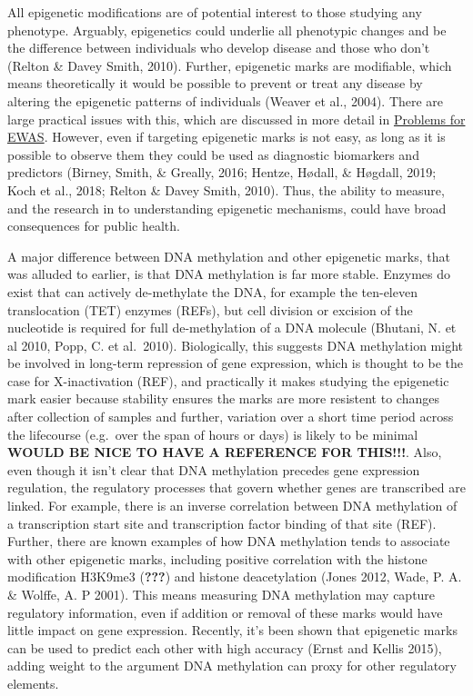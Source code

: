 \documentclass[11pt,twoside]{bristolthesis}
\begin{document}
All epigenetic modifications are of potential interest to those studying any phenotype. Arguably, epigenetics could underlie all phenotypic changes and be the difference between individuals who develop disease and those who don't (Relton \& Davey Smith, 2010). Further, epigenetic marks are modifiable, which means theoretically it would be possible to prevent or treat any disease by altering the epigenetic patterns of individuals (Weaver et al., 2004). There are large practical issues with this, which are discussed in more detail in \protect\hyperlink{problems-for-ewas}{Problems for EWAS}. However, even if targeting epigenetic marks is not easy, as long as it is possible to observe them they could be used as diagnostic biomarkers and predictors (Birney, Smith, \& Greally, 2016; Hentze, Hødall, \& Høgdall, 2019; Koch et al., 2018; Relton \& Davey Smith, 2010). Thus, the ability to measure, and the research in to understanding epigenetic mechanisms, could have broad consequences for public health.

A major difference between DNA methylation and other epigenetic marks, that was alluded to earlier, is that DNA methylation is far more stable. Enzymes do exist that can actively de-methylate the DNA, for example the ten-eleven translocation (TET) enzymes (REFs), but cell division or excision of the nucleotide is required for full de-methylation of a DNA molecule (Bhutani, N. et al 2010, Popp, C. et al.~2010). Biologically, this suggests DNA methylation might be involved in long-term repression of gene expression, which is thought to be the case for X-inactivation (REF), and practically it makes studying the epigenetic mark easier because stability ensures the marks are more resistent to changes after collection of samples and further, variation over a short time period across the lifecourse (e.g.~over the span of hours or days) is likely to be minimal \textbf{WOULD BE NICE TO HAVE A REFERENCE FOR THIS!!!}. Also, even though it isn't clear that DNA methylation precedes gene expression regulation, the regulatory processes that govern whether genes are transcribed are linked. For example, there is an inverse correlation between DNA methylation of a transcription start site and transcription factor binding of that site (REF). Further, there are known examples of how DNA methylation tends to associate with other epigenetic marks, including positive correlation with the histone modification H3K9me3 ({\textbf{???}}) and histone deacetylation (Jones 2012, Wade, P. A. \& Wolffe, A. P 2001). This means measuring DNA methylation may capture regulatory information, even if addition or removal of these marks would have little impact on gene expression. Recently, it's been shown that epigenetic marks can be used to predict each other with high accuracy (Ernst and Kellis 2015), adding weight to the argument DNA methylation can proxy for other regulatory elements.
\end{document}
